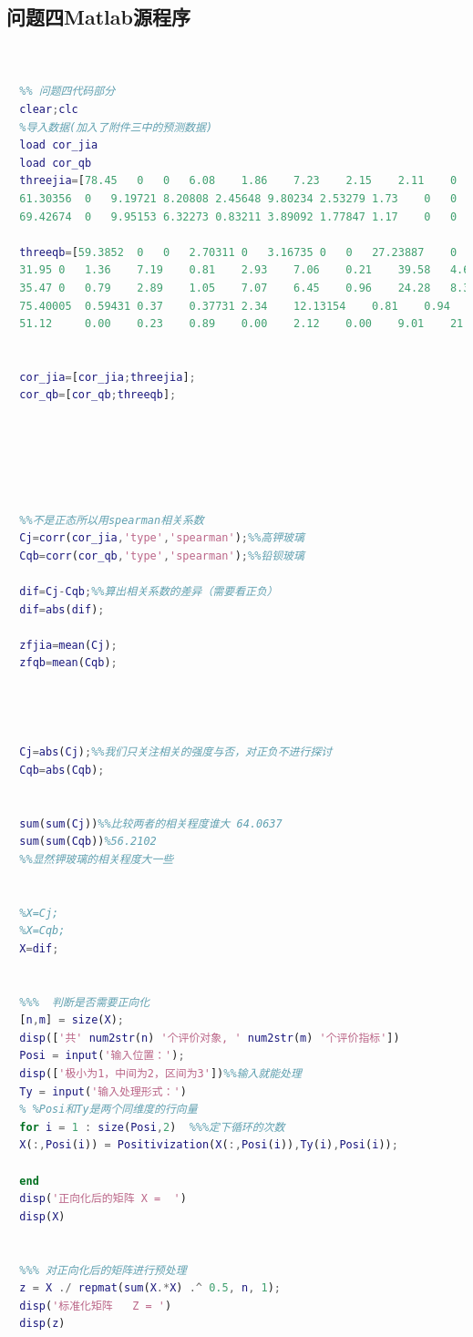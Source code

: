 \documentclass[withoutpreface,bwprint]{cumcmthesis} %
\begin{document}
\begin{appendices}
\newpage
\section{问题四Matlab源程序}

\begin{lstlisting}[language=matlab]
  
  
  %% 问题四代码部分
  clear;clc
  %导入数据(加入了附件三中的预测数据)
  load cor_jia
  load cor_qb
  threejia=[78.45	0	0	6.08	1.86	7.23	2.15	2.11	0	0	1.06	0.03	0	0.51
  61.30356	0	9.19721	8.20808	2.45648	9.80234	2.53279	1.73	0	0	0.26321	0	0	0
  69.42674	0	9.95153	6.32273	0.83211	3.89092	1.77847	1.17	0	0	1.1589	0	0	0.11];
  
  threeqb=[59.3852	0	0	2.70311	0	3.16735	0	0	27.23887	0	4.75198	0	0	0
  31.95	0	1.36	7.19	0.81	2.93	7.06	0.21	39.58	4.69	2.68	0.52	0	0
  35.47	0	0.79	2.89	1.05	7.07	6.45	0.96	24.28	8.31	8.45	0.28	0	0
  75.40005	0.59431	0.37	0.37731	2.34	12.13154	0.81	0.94	8.83383	2.16	0	0.21	0.49	0
  51.12 	0.00 	0.23 	0.89 	0.00 	2.12 	0.00 	9.01 	21.24 	11.34 	1.46 	0.31 	0.00 	2.26 ];
  
  
  cor_jia=[cor_jia;threejia];
  cor_qb=[cor_qb;threeqb];
  
  
  
  
  
  
  %%不是正态所以用spearman相关系数
  Cj=corr(cor_jia,'type','spearman');%%高钾玻璃
  Cqb=corr(cor_qb,'type','spearman');%%铅钡玻璃
  
  dif=Cj-Cqb;%%算出相关系数的差异（需要看正负）
  dif=abs(dif);
  
  zfjia=mean(Cj);
  zfqb=mean(Cqb);
  
  
  
  
  Cj=abs(Cj);%%我们只关注相关的强度与否，对正负不进行探讨
  Cqb=abs(Cqb);
  
  
  sum(sum(Cj))%%比较两者的相关程度谁大 64.0637
  sum(sum(Cqb))%56.2102
  %%显然钾玻璃的相关程度大一些
  
  
  %X=Cj;
  %X=Cqb;
  X=dif;
  
  
  %%%  判断是否需要正向化
  [n,m] = size(X);
  disp(['共' num2str(n) '个评价对象, ' num2str(m) '个评价指标']) 
  Posi = input('输入位置：'); 
  disp(['极小为1，中间为2，区间为3'])%%输入就能处理
  Ty = input('输入处理形式：')   
  % %Posi和Ty是两个同维度的行向量
  for i = 1 : size(Posi,2)  %%%定下循环的次数
  X(:,Posi(i)) = Positivization(X(:,Posi(i)),Ty(i),Posi(i));
  
  end
  disp('正向化后的矩阵 X =  ')
  disp(X)
  
  
  %%% 对正向化后的矩阵进行预处理
  z = X ./ repmat(sum(X.*X) .^ 0.5, n, 1);
  disp('标准化矩阵   Z = ')
  disp(z)
  

\end{lstlisting}
\end{appendices}
\end{document}
